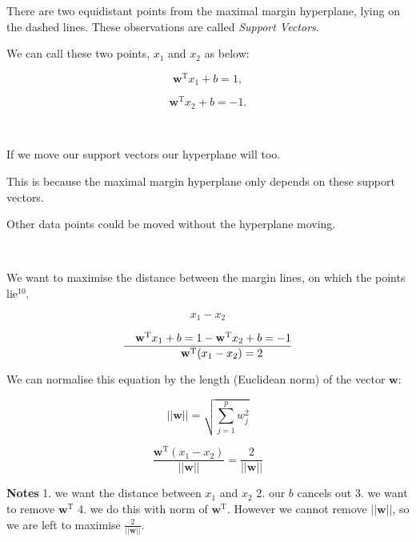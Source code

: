 \documentclass[11pt]{article}
\begin{document}
    There are two equidistant points from the maximal margin hyperplane,
lying on the dashed lines. These observations are called \emph{Support
Vectors}.

We can call these two points, \(x_1\) and \(x_2\) as below:

\[\mathbf{w}^{\mathrm T}x_1 + b = 1,\]

\[\mathbf{w}^{\mathrm T}x_2 + b = -1.\]

    \begin{center}
    \end{center}
    { \hspace*{\fill} \\}
    
    If we move our support vectors our hyperplane will too.

This is because the maximal margin hyperplane only depends on these
support vectors.

Other data points could be moved without the hyperplane moving.

    \begin{center}
    \end{center}
    { \hspace*{\fill} \\}
    
    We want to maximise the distance between the margin lines, on which the
points lie\(^{10}\).

\[x_1-x_2\]

    \[
\frac{\phantom{\quad}\mathbf{w}^{\mathrm T}x_1 + b = 1\\ - 
\mathbf{w}^{\mathrm T}x_2 + b = -1 \\}{\\ \mathbf{w}^{\mathrm T}(x_1 - x_2) = 2}
\]

    We can normalise this equation by the length (Euclidean norm) of the
vector \(\mathbf{w}\):

\[
||\mathbf{w}|| = \sqrt{\sum^p_{j=1}w^2_j}
\]

\[
\frac{\mathbf{w}^{\mathrm T}(x_1 - x_2)}{||\mathbf{w}||} = \frac{2}{||\mathbf{w}||}
\]

    \textbf{Notes} 1. we want the distance between \(x_1\) and \(x_2\) 2.
our \(b\) cancels out 3. we want to remove \(\mathbf{w}^{\mathrm T}\) 4.
we do this with norm of \(\mathbf{w}^{\mathrm T}\). However we cannot
remove \(||\mathbf{w}||\), so we are left to maximise
\(\frac{2}{||\mathbf{w}||}\).
\end{document}
